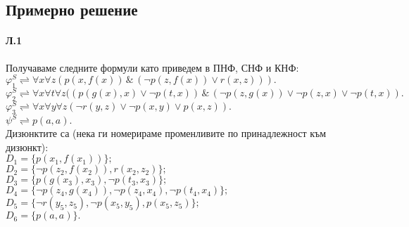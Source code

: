 \documentclass[12pt]{article}
\begin{document}
\subsection{Примерно решение}
\paragraph{\hspace{0.5em} Л.1}
\begin{addmargin}[1em]{2em}
Получаваме следните формули като приведем в ПНФ, СНФ и КНФ: \\
$\varphi_1^S \rightleftharpoons \forall x \forall z (p(x,f(x))\,\&\,(\neg p(z, f(x))\lor r(x,z))). $ \\
$\varphi_2^S \rightleftharpoons \forall x \forall t \forall z((p(g(x),x)\lor \neg p(t,x))\,\&\,(\neg p(z, g(x)) \lor \neg p(z,x) \lor \neg p(t,x)). $ \\
$\varphi_3^S \rightleftharpoons \forall x \forall y \forall z (\neg r(y,z) \lor \neg p(x,y) \lor p(x, z)). $ \\
$\psi^S \rightleftharpoons p(a,a).$ \\
Дизюнктите са (нека ги номерираме променливите по принадлежност към дизюнкт): \\
$D_1 = \{ p(x_1,f(x_1))\};$ \\
$D_2 = \{ \neg p(z_2, f(x_2)), r(x_2, z_2)\};$ \\
$D_3 = \{ p(g(x_3), x_3), \neg p(t_3, x_3)\};$ \\
$D_4 = \{ \neg p(z_4,g(x_4)), \neg p(z_4, x_4), \neg p(t_4, x_4)\};$ \\
$D_5 = \{ \neg r(y_5,z_5), \neg p( x_5,y_5), p(x_5, z_5)\};$ \\
$D_6 = \{ p(a,a)\}.$
\end{addmargin}
\end{document}
